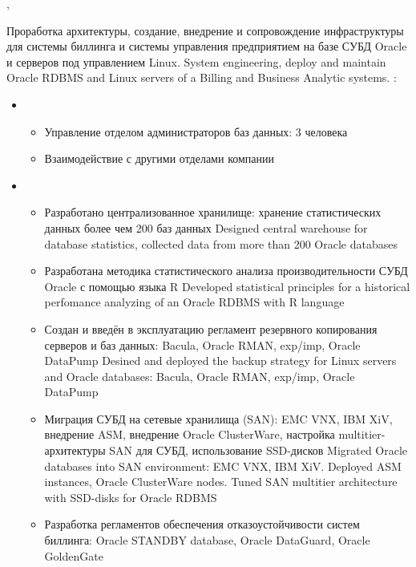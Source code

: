 \documentclass[11pt,a4paper,sans]{moderncv}        %
\begin{document}
{\protect{}}
{\cityperm, \country}
{}
{
	{Проработка архитектуры, создание, внедрение и сопровождение инфраструктуры для системы биллинга и системы управления предприятием на базе СУБД Oracle и серверов под управлением Linux.}
	{System engineering, deploy and maintain Oracle RDBMS and Linux servers of a Billing and Business Analytic systems.}\newline{}
	\achievements:
	\begin{itemize}	
	\item {}	
		\begin{itemize}
			\item {}
				{Управление отделом администраторов баз данных: 3 человека}
				{}
			\item {}
				{Взаимодействие с другими отделами компании}
				{}
		\end{itemize}
	\item {}
		\begin{itemize}
			\item {}
				{Разработано централизованное хранилище: хранение статистических данных более чем 200 баз данных}
				{Designed central warehouse for database statistics, collected data from more than 200 Oracle databases}
			\item {}
				{Разработана методика статистического анализа производительности СУБД Oracle с помощью языка R}
				{Developed statistical principles for a historical perfomance analyzing of an Oracle RDBMS with R language}
			\item {}
				{Создан и введён в эксплуатацию регламент резервного копирования серверов и баз данных: Bacula, Oracle RMAN, exp/imp, Oracle DataPump}
				{Desined and deployed the backup strategy for Linux servers and Oracle databases: Bacula, Oracle RMAN, exp/imp, Oracle DataPump}
			\item {}
				{Миграция СУБД на сетевые хранилища (SAN): EMC VNX, IBM XiV, внедрение ASM, внедрение Oracle ClusterWare, настройка multitier-архитектуры SAN для СУБД, использование SSD-дисков}
				{Migrated Oracle databases into SAN environment: EMC VNX, IBM XiV. Deployed ASM instances, Oracle ClusterWare nodes. Tuned SAN multitier architecture with SSD-disks for Oracle RDBMS}
			\item {}
				{Разработка регламентов обеспечения отказоустойчивости систем биллинга: Oracle STANDBY database, Oracle DataGuard, Oracle GoldenGate}

\end{itemize}
\end{itemize}}
\end{document}
